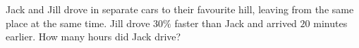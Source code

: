 Jack and Jill drove in separate cars to their favourite hill, leaving from the same place at the same time. Jill drove $30\%$ faster than Jack and arrived $20$ minutes earlier. How many hours did Jack drive?
